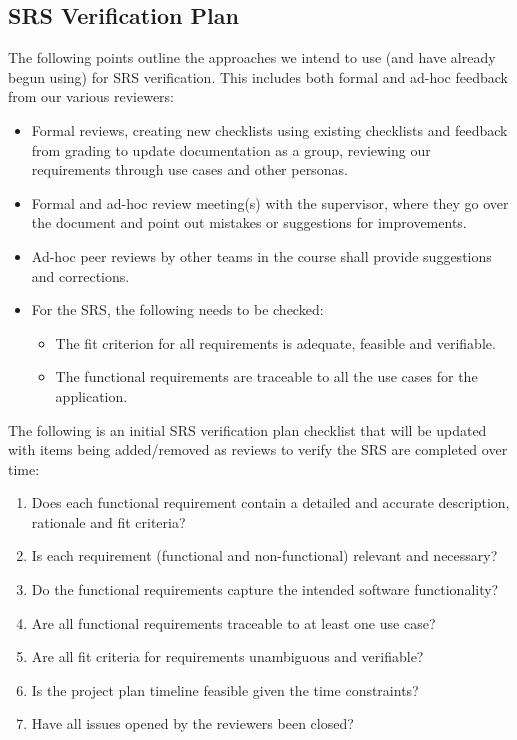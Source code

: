 \documentclass[12pt, titlepage]{article}
\begin{document}
\subsection{SRS Verification Plan}
The following points outline the approaches we intend to use (and have already begun using) for SRS verification. This includes both formal and ad-hoc feedback from our various reviewers:
\begin{itemize}
    \item Formal reviews, creating new checklists using existing checklists and feedback from grading to update documentation as a group, reviewing our requirements through use cases and other personas.
    \item Formal and ad-hoc review meeting(s) with the supervisor, where they go over the document and point out mistakes or suggestions for improvements.
    \item Ad-hoc peer reviews by other teams in the course shall provide suggestions and corrections.
    \item For the SRS, the following needs to be checked:
    \begin{itemize}
        \item The fit criterion for all requirements is adequate, feasible and verifiable.
        \item The functional requirements are traceable to all the use cases for the application.
    \end{itemize}
\end{itemize}

\noindent The following is an initial SRS verification plan checklist that will be updated with items being added/removed as reviews to verify the SRS are completed over time:
\begin{enumerate}[label=$\square$]
    \item Does each functional requirement contain a detailed and accurate description, rationale and fit criteria?
    \item Is each requirement (functional and non-functional) relevant and necessary?
    \item Do the functional requirements capture the intended software functionality?
    \item Are all functional requirements traceable to at least one use case?
    \item Are all fit criteria for requirements unambiguous and verifiable?
    \item Is the project plan timeline feasible given the time constraints?
    \item Have all issues opened by the reviewers been closed?
\end{enumerate}
\end{document}
